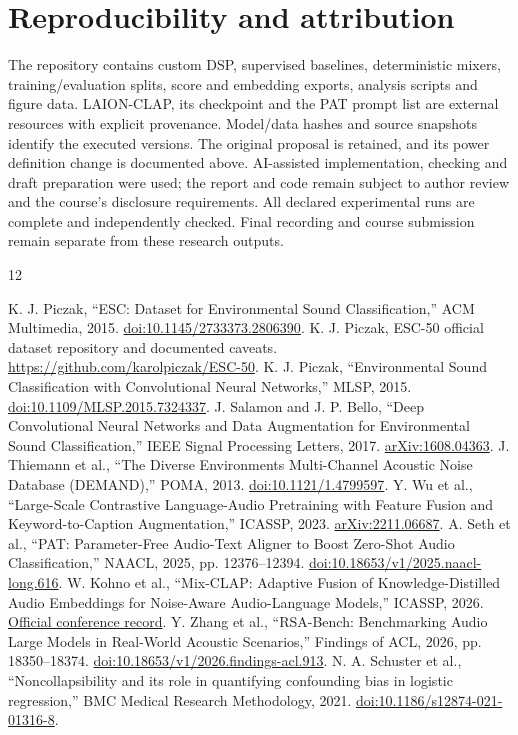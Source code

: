 \documentclass[a4paper,10pt]{article}
\begin{document}
\section*{Reproducibility and attribution}
The repository contains custom DSP, supervised baselines, deterministic mixers,
training/evaluation splits, score and embedding exports, analysis scripts and
figure data. LAION-CLAP, its checkpoint and the PAT prompt list are external
resources with explicit provenance. Model/data hashes and source snapshots
identify the executed versions. The original proposal is retained, and its power
definition change is documented above. AI-assisted implementation, checking and
draft preparation were used; the report and code remain subject to author
review and the course's disclosure requirements. All declared experimental runs
are complete and independently checked. Final recording and course submission
remain separate from these research outputs.

\clearpage
\begin{thebibliography}{12}
\raggedright
{} K. J. Piczak, ``ESC: Dataset for Environmental Sound Classification,'' ACM Multimedia, 2015. \href{https://doi.org/10.1145/2733373.2806390}{doi:10.1145/2733373.2806390}.
 K. J. Piczak, ESC-50 official dataset repository and documented caveats. \url{https://github.com/karolpiczak/ESC-50}.
 K. J. Piczak, ``Environmental Sound Classification with Convolutional Neural Networks,'' MLSP, 2015. \href{https://doi.org/10.1109/MLSP.2015.7324337}{doi:10.1109/MLSP.2015.7324337}.
 J. Salamon and J. P. Bello, ``Deep Convolutional Neural Networks and Data Augmentation for Environmental Sound Classification,'' IEEE Signal Processing Letters, 2017. \href{https://arxiv.org/abs/1608.04363}{arXiv:1608.04363}.
 J. Thiemann et al., ``The Diverse Environments Multi-Channel Acoustic Noise Database (DEMAND),'' POMA, 2013. \href{https://doi.org/10.1121/1.4799597}{doi:10.1121/1.4799597}.
 Y. Wu et al., ``Large-Scale Contrastive Language-Audio Pretraining with Feature Fusion and Keyword-to-Caption Augmentation,'' ICASSP, 2023. \href{https://arxiv.org/abs/2211.06687}{arXiv:2211.06687}.
 A. Seth et al., ``PAT: Parameter-Free Audio-Text Aligner to Boost Zero-Shot Audio Classification,'' NAACL, 2025, pp. 12376--12394. \href{https://aclanthology.org/2025.naacl-long.616/}{doi:10.18653/v1/2025.naacl-long.616}.
 W. Kohno et al., ``Mix-CLAP: Adaptive Fusion of Knowledge-Distilled Audio Embeddings for Noise-Aware Audio-Language Models,'' ICASSP, 2026. \href{https://www.cmsworkshops.com/ICASSP2026/view_paper.php?PaperNum=4206}{Official conference record}.
 Y. Zhang et al., ``RSA-Bench: Benchmarking Audio Large Models in Real-World Acoustic Scenarios,'' Findings of ACL, 2026, pp. 18350--18374. \href{https://aclanthology.org/2026.findings-acl.913/}{doi:10.18653/v1/2026.findings-acl.913}.
 N. A. Schuster et al., ``Noncollapsibility and its role in quantifying confounding bias in logistic regression,'' BMC Medical Research Methodology, 2021. \href{https://doi.org/10.1186/s12874-021-01316-8}{doi:10.1186/s12874-021-01316-8}.
\end{thebibliography}
\end{document}
